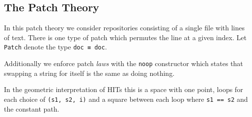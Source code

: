 \subsection{The Patch Theory}

In this patch theory we consider repositories consisting of a single file with lines of text.
There is one type of patch which permutes the line at a given index. Let \texttt{Patch} denote the type
\texttt{doc ≡ doc}.

Additionally we enforce patch \emph{laws} with the \texttt{noop} constructor which states that
swapping a string for itself is the same as doing nothing.

In the geometric interpretation of HITs this is a space with one point, loops for each choice of
\texttt{(s1, s2, i)} and a square between each loop where \texttt{s1 == s2} and the constant path.

